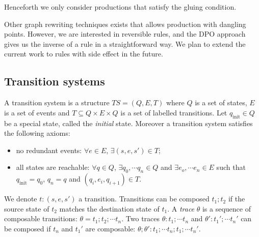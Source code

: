 Henceforth we only consider productions that satisfy the gluing condition.

\begin{remark}
Other graph rewriting techniques exists that allows production with dangling points. However, we are interested in reversible rules, and the DPO approach gives us the inverse of a rule in a straightforward way. We plan to extend the current work to rules with side effect in the future.
\end{remark}

\subsection{Transition systems}
\label{sec:ts}

\begin{definition}
  \label{def:ts_nielsen}
  A transition system is a structure $TS = (Q,E,T)$ where $Q$ is a set of states, $E$ is a set of events and $T\subseteq Q\times E\times Q$ is a set of labelled transitions. Let $q_{\text{init}}\in Q$ be a special state, called the \emph{initial} state. Moreover a transition system satisfies the following axioms:
  \begin{itemize}
  \item no redundant events: $\forall e\in E$, $\exists (s,e,s')\in T$;
  \item all states are reachable: $\forall q\in Q$, $\exists q_0,\cdots q_n \in Q$ and $\exists e_o,\cdots e_n\in E$ such that $q_{\text{init}} = q_0$, $q_n =q$ and $(q_i,e_i,q_{i+1}) \in T$.
  \end{itemize}
\end{definition}

We denote $t:(s,e,s')$ a transition. Transitions can be composed $t_1;t_2$ if the source state of $t_2$ matches the destination state of $t_1$. A \emph{trace} $\theta$ is a sequence of composable transitions: $\theta=t_1;t_2;\cdots t_n$. Two traces $\theta:t_1;\cdots t_n$ and $\theta':t_1';\cdots t_n'$ can be composed if $t_n$ and $t_1'$ are composable: $\theta;\theta':t_1;\cdots t_n;t_1;\cdots t_n'$.

